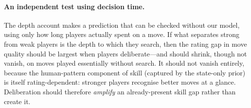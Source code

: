 
\paragraph{An independent test using decision time.}
The depth account makes a prediction that can be checked without our model, using only how
long players actually spent on a move. If what separates strong from weak players is the
depth to which they search, then the rating gap in move quality should be largest when
players deliberate---and should shrink, though not vanish, on moves played essentially
without search. It should not vanish entirely, because the human-pattern component of skill
(captured by the state-only prior) is itself rating-dependent: stronger players recognise
better moves at a glance. Deliberation should therefore \emph{amplify} an already-present
skill gap rather than create it.

